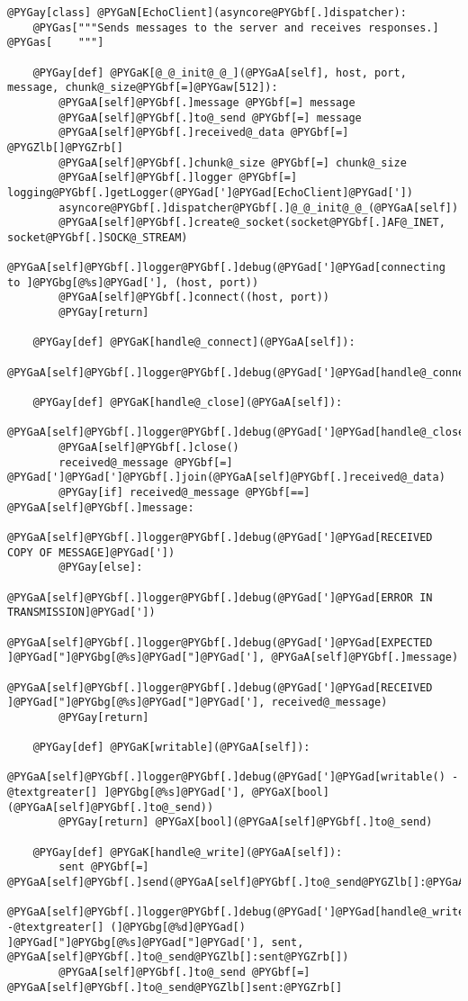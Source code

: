 \documentclass[a4paper,10pt,english]{manual}
\begin{document}
\begin{Verbatim}[commandchars=@\[\]]
@PYGay[class] @PYGaN[EchoClient](asyncore@PYGbf[.]dispatcher):
    @PYGas["""Sends messages to the server and receives responses.]
@PYGas[    """]

    @PYGay[def] @PYGaK[@_@_init@_@_](@PYGaA[self], host, port, message, chunk@_size@PYGbf[=]@PYGaw[512]):
        @PYGaA[self]@PYGbf[.]message @PYGbf[=] message
        @PYGaA[self]@PYGbf[.]to@_send @PYGbf[=] message
        @PYGaA[self]@PYGbf[.]received@_data @PYGbf[=] @PYGZlb[]@PYGZrb[]
        @PYGaA[self]@PYGbf[.]chunk@_size @PYGbf[=] chunk@_size
        @PYGaA[self]@PYGbf[.]logger @PYGbf[=] logging@PYGbf[.]getLogger(@PYGad[']@PYGad[EchoClient]@PYGad['])
        asyncore@PYGbf[.]dispatcher@PYGbf[.]@_@_init@_@_(@PYGaA[self])
        @PYGaA[self]@PYGbf[.]create@_socket(socket@PYGbf[.]AF@_INET, socket@PYGbf[.]SOCK@_STREAM)
        @PYGaA[self]@PYGbf[.]logger@PYGbf[.]debug(@PYGad[']@PYGad[connecting to ]@PYGbg[@%s]@PYGad['], (host, port))
        @PYGaA[self]@PYGbf[.]connect((host, port))
        @PYGay[return]

    @PYGay[def] @PYGaK[handle@_connect](@PYGaA[self]):
        @PYGaA[self]@PYGbf[.]logger@PYGbf[.]debug(@PYGad[']@PYGad[handle@_connect()]@PYGad['])

    @PYGay[def] @PYGaK[handle@_close](@PYGaA[self]):
        @PYGaA[self]@PYGbf[.]logger@PYGbf[.]debug(@PYGad[']@PYGad[handle@_close()]@PYGad['])
        @PYGaA[self]@PYGbf[.]close()
        received@_message @PYGbf[=] @PYGad[']@PYGad[']@PYGbf[.]join(@PYGaA[self]@PYGbf[.]received@_data)
        @PYGay[if] received@_message @PYGbf[==] @PYGaA[self]@PYGbf[.]message:
            @PYGaA[self]@PYGbf[.]logger@PYGbf[.]debug(@PYGad[']@PYGad[RECEIVED COPY OF MESSAGE]@PYGad['])
        @PYGay[else]:
            @PYGaA[self]@PYGbf[.]logger@PYGbf[.]debug(@PYGad[']@PYGad[ERROR IN TRANSMISSION]@PYGad['])
            @PYGaA[self]@PYGbf[.]logger@PYGbf[.]debug(@PYGad[']@PYGad[EXPECTED ]@PYGad["]@PYGbg[@%s]@PYGad["]@PYGad['], @PYGaA[self]@PYGbf[.]message)
            @PYGaA[self]@PYGbf[.]logger@PYGbf[.]debug(@PYGad[']@PYGad[RECEIVED ]@PYGad["]@PYGbg[@%s]@PYGad["]@PYGad['], received@_message)
        @PYGay[return]

    @PYGay[def] @PYGaK[writable](@PYGaA[self]):
        @PYGaA[self]@PYGbf[.]logger@PYGbf[.]debug(@PYGad[']@PYGad[writable() -@textgreater[] ]@PYGbg[@%s]@PYGad['], @PYGaX[bool](@PYGaA[self]@PYGbf[.]to@_send))
        @PYGay[return] @PYGaX[bool](@PYGaA[self]@PYGbf[.]to@_send)

    @PYGay[def] @PYGaK[handle@_write](@PYGaA[self]):
        sent @PYGbf[=] @PYGaA[self]@PYGbf[.]send(@PYGaA[self]@PYGbf[.]to@_send@PYGZlb[]:@PYGaA[self]@PYGbf[.]chunk@_size@PYGZrb[])
        @PYGaA[self]@PYGbf[.]logger@PYGbf[.]debug(@PYGad[']@PYGad[handle@_write() -@textgreater[] (]@PYGbg[@%d]@PYGad[) ]@PYGad["]@PYGbg[@%s]@PYGad["]@PYGad['], sent, @PYGaA[self]@PYGbf[.]to@_send@PYGZlb[]:sent@PYGZrb[])
        @PYGaA[self]@PYGbf[.]to@_send @PYGbf[=] @PYGaA[self]@PYGbf[.]to@_send@PYGZlb[]sent:@PYGZrb[]


\end{Verbatim}
\end{document}
